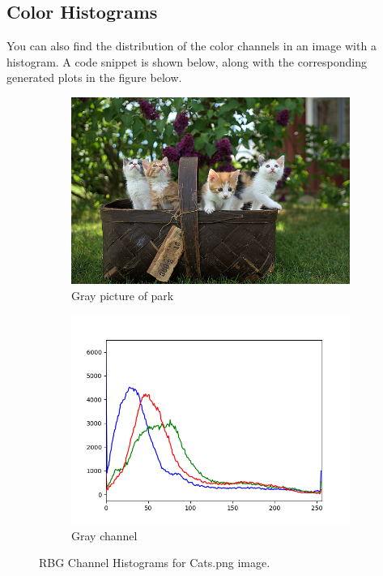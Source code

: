 \subsection{Color Histograms}

  You can also find the distribution of the color channels in an image with a histogram. A code snippet is shown below, along with the corresponding generated plots in the figure below. 

  \begin{figure}[H]
    \centering
    \begin{subfigure}[b]{0.45\textwidth}
    \centering
        \includegraphics[width=\textwidth]{img/Cats.png}
        \caption{Gray picture of park}
        \label{fig:5d}
    \end{subfigure}
    \begin{subfigure}[b]{0.45\textwidth}
    \centering
        \includegraphics[width=\textwidth]{img/Cats_color_hist.png}
        \caption{Gray channel}
        \label{fig:6d}
    \end{subfigure}
    \label{fig:cats_histogram}
    \caption{RBG Channel Histograms for Cats.png image. }
  \end{figure}

